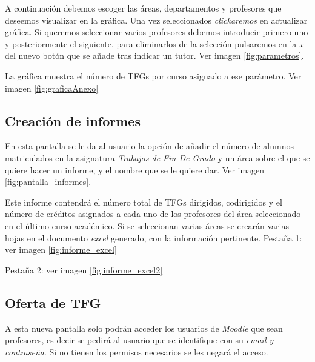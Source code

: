 
A continuación debemos escoger las áreas, departamentos y profesores que deseemos visualizar en la gráfica. Una vez seleccionados \emph{clickaremos} en actualizar gráfica.
Si queremos seleccionar varios profesores debemos introducir primero uno y posteriormente el siguiente, para eliminarlos de la selección pulsaremos en la \emph{x} del nuevo botón que se añade tras indicar un tutor. Ver imagen \ref{fig:parametros}.


La gráfica muestra el número de TFGs por curso asignado a ese parámetro. Ver imagen \ref{fig:graficaAnexo}


\subsection{Creación de informes}
En esta pantalla se le da al usuario la opción de añadir el número de alumnos matriculados en la asignatura \emph{Trabajos de Fin De Grado} y un área sobre el que se quiere hacer un informe, y el nombre que se le quiere dar. 
Ver imagen \ref{fig:pantalla_informes}.


Este informe contendrá el número total de TFGs dirigidos, codirigidos y el número de créditos asignados a cada uno de los profesores del área seleccionado en el último curso académico. Si se seleccionan varias áreas se crearán varias hojas en el documento \emph{excel} generado, con la información pertinente. 
Pestaña 1: ver imagen \ref{fig:informe_excel}

Pestaña 2: ver imagen \ref{fig:informe_excel2}

\subsection{Oferta de TFG}

A esta nueva pantalla solo podrán acceder los usuarios de \emph{Moodle} que sean profesores, es decir se pedirá al usuario que se identifique con su \emph{email y contraseña}. Si no tienen los permisos necesarios se les negará el acceso.

